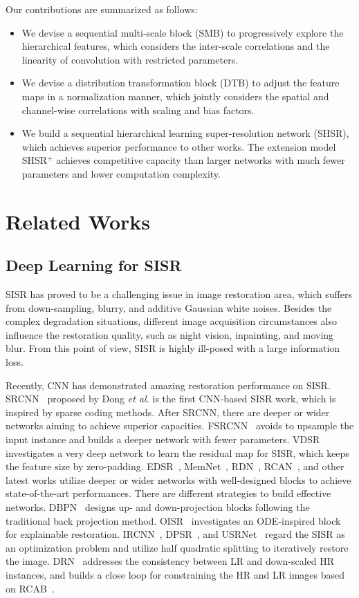 \documentclass[manuscript,screen]{acmart}
\begin{document}
Our contributions are summarized as follows:
\begin{itemize}
	\item
	We devise a sequential multi-scale block (SMB) to progressively explore the hierarchical features, which considers the inter-scale correlations and the linearity of convolution with restricted parameters.
	\item
	We devise a distribution transformation block (DTB) to adjust the feature maps in a normalization manner, which jointly considers the spatial and channel-wise correlations with scaling and bias factors.
	\item
We build a sequential hierarchical learning super-resolution network (SHSR), which achieves superior performance to other works. The extension model SHSR$^+$ achieves competitive capacity than larger networks with much fewer parameters and lower computation complexity.
\end{itemize}

\section{Related Works}
\subsection{Deep Learning for SISR} 
SISR has proved to be a challenging issue in image restoration area, which suffers from down-sampling, blurry, and additive Gaussian white noises. Besides the complex degradation situations, different image acquisition circumstances also influence the restoration quality, such as night vision, inpainting, and moving blur. From this point of view, SISR is highly ill-posed with a large information loss.

Recently, CNN has demonstrated amazing restoration performance on SISR. SRCNN~\cite{srcnn_pami2016} proposed by Dong \textit{et al.} is the first CNN-based SISR work, which is inspired by sparse coding methods. After SRCNN, there are deeper or wider networks aiming to achieve superior capacities. FSRCNN~\cite{fsrcnn_eccv2016} avoids to upsample the input instance and builds a deeper network with fewer parameters. VDSR~\cite{vdsr_cvpr2016} investigates a very deep network to learn the residual map for SISR, which keeps the feature size by zero-padding. EDSR~\cite{edsr_cvpr2017}, MemNet~\cite{memnet_iccv2017}, RDN~\cite{rdn_pami2020}, RCAN~\cite{rcan_eccv2018}, and other latest works utilize deeper or wider networks with well-designed blocks to achieve state-of-the-art performances. There are different strategies to build effective networks. DBPN~\cite{dbpn_pami2020} designs up- and down-projection blocks following the traditional back projection method. OISR~\cite{oisr_cvpr2019} investigates an ODE-inspired block for explainable restoration. IRCNN~\cite{ircnn_cvpr2017}, DPSR~\cite{dpsr_cvpr2019}, and USRNet~\cite{usrnet_cvpr2020} regard the SISR as an optimization problem and utilize half quadratic splitting to iteratively restore the image. DRN~\cite{drn_cvpr2020} addresses the consistency between LR and down-scaled HR instances, and builds a close loop for constraining the HR and LR images based on RCAB~\cite{rcan_eccv2018}.
\end{document}
